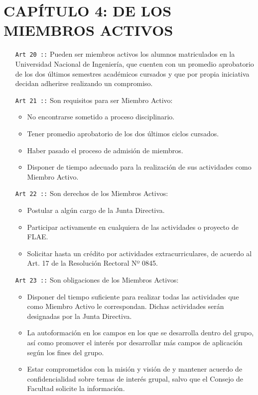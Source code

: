 \section*{CAPÍTULO 4: DE LOS MIEMBROS ACTIVOS}
\begin{itemize}
  \item [\texttt{Art 20 ::}] Pueden ser miembros activos los alumnos matriculados en la Universidad Nacional
  de Ingeniería, que cuenten con un promedio aprobatorio de los dos últimos semestres
  académicos cursados y que por propia iniciativa decidan adherirse realizando un compromiso.
  \item [\texttt{Art 21 ::}] Son requisitos para ser Miembro Activo:
  \begin{itemize}
    \item No encontrarse sometido a proceso disciplinario.
    \item Tener promedio aprobatorio de los dos últimos ciclos cursados.
    \item Haber pasado el proceso de admisión de miembros.
    \item Disponer de tiempo adecuado para la realización de sus actividades como Miembro Activo.

  \end{itemize}
  \item [\texttt{Art 22 ::}] Son derechos de los Miembros Activos:
  \begin{itemize}
    \item Postular a algún cargo de la Junta Directiva.
    \item Participar activamente en cualquiera de las actividades o proyecto de FLAE.
    \item Solicitar hasta un crédito por actividades extracurriculares, de acuerdo al Art. 17 de la Resolución Rectoral Nº 0845.
  \end{itemize}
  \item [\texttt{Art 23 ::}] Son obligaciones de los Miembros Activos:
  \begin{itemize}
    \item Disponer del tiempo suficiente para realizar todas las actividades que como Miembro Activo le correspondan. Dichas actividades serán designadas por la Junta Directiva.
    \item La autoformación en los campos en los que se desarrolla dentro del grupo, así como promover el interés por desarrollar más campos de aplicación según los fines del grupo.
    \item Estar comprometidos con la misión y visión de \flae y mantener acuerdo de confidencialidad sobre temas de interés grupal, salvo que el Consejo de Facultad solicite la información.
  \end{itemize}

\end{itemize}

